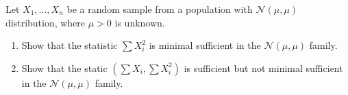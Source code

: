 
\begin{exercise}

Let $X_1, \dots, X_n$ be a random sample from a population with $\mathcal N(\mu, \mu)$ distribution, where $\mu > 0$ is unknown.

\begin{enumerate}[label = (\alph*)]
    \item Show that the statistic $\sum X_i^2$ is minimal sufficient in the $\mathcal N(\mu, \mu)$ family.
    \item Show that the static $(\sum X_i, \sum X_i^2)$ is sufficient but not minimal sufficient in the $\mathcal N(\mu, \mu)$ family.
\end{enumerate}

\end{exercise}


